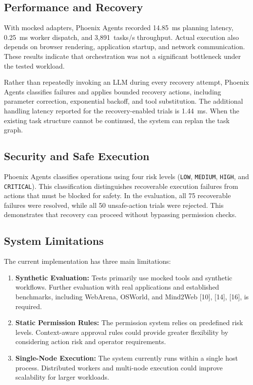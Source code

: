 \documentclass[conference]{IEEEtran}
\begin{document}
\subsection{Performance and Recovery}

With mocked adapters, Phoenix Agents recorded 14.85~ms planning latency, 0.25~ms worker dispatch, and 3,891~tasks/s throughput. Actual execution also depends on browser rendering, application startup, and network communication. These results indicate that orchestration was not a significant bottleneck under the tested workload.

Rather than repeatedly invoking an LLM during every recovery attempt,
Phoenix Agents classifies failures and applies bounded recovery
actions, including parameter correction, exponential backoff, and
tool substitution. The additional handling latency reported for
the recovery-enabled trials is 1.44~ms. When the existing task
structure cannot be continued, the system can replan the task graph.

\subsection{Security and Safe Execution}

Phoenix Agents classifies operations using four risk levels
(\texttt{LOW}, \texttt{MEDIUM}, \texttt{HIGH}, and \texttt{CRITICAL}).
This classification distinguishes recoverable execution failures
from actions that must be blocked for safety. In the evaluation,
all 75 recoverable failures were resolved, while all 50 unsafe-action
trials were rejected. This demonstrates that recovery can proceed
without bypassing permission checks.

\subsection{System Limitations}

The current implementation has three main limitations:

\begin{enumerate}
    \item \textbf{Synthetic Evaluation:} Tests primarily use mocked
    tools and synthetic workflows. Further evaluation with real
    applications and established benchmarks, including WebArena,
    OSWorld, and Mind2Web [10], [14], [16], is required.

    \item \textbf{Static Permission Rules:} The permission system
    relies on predefined risk levels. Context-aware approval rules
    could provide greater flexibility by considering action risk
    and operator requirements.

    \item \textbf{Single-Node Execution:} The system currently runs
    within a single host process. Distributed workers and multi-node
    execution could improve scalability for larger workloads.
\end{enumerate}
\end{document}
